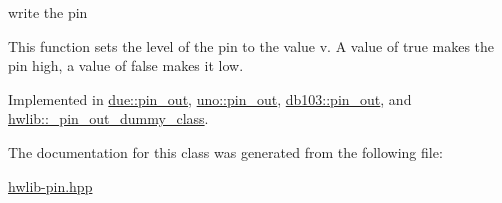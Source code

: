 write the pin 

This function sets the level of the pin to the value v. A value of true makes the pin high, a value of false makes it low. 

Implemented in \hyperlink{classdue_1_1pin__out_a65a516d8139c1efb217d90f5bdffe0a4}{due\+::pin\+\_\+out}, \hyperlink{classuno_1_1pin__out_acdbf9464c592814d5b345dfb4aaa24c9}{uno\+::pin\+\_\+out}, \hyperlink{classdb103_1_1pin__out_a73b6d2c8c5c11baf263f5c3cd8078ad9}{db103\+::pin\+\_\+out}, and \hyperlink{classhwlib_1_1__pin__out__dummy__class_a2a1c7ef6046fbf45a92f5036632e4655}{hwlib\+::\+\_\+pin\+\_\+out\+\_\+dummy\+\_\+class}.



The documentation for this class was generated from the following file\+:\begin{DoxyCompactItemize}
\item 
\hyperlink{hwlib-pin_8hpp}{hwlib-\/pin.\+hpp}\end{DoxyCompactItemize}
